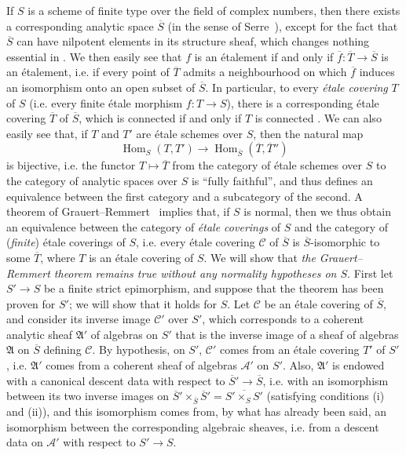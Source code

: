 \documentclass{article}
\newcommand{\scr}[1]{{\mathscr{#1}}}
\newcommand{\fk}[1]{{\mathfrak{#1}}}
\DeclareMathOperator{\Hom}{Hom}
\newcommand{\oldpage}[1]{\marginpar{\footnotesize$\Big\vert$ \textit{p.~#1}}}
\begin{document}
If $S$ is a scheme of finite type over the field of complex numbers, then there exists a corresponding analytic space $\overline{S}$ (in the sense of Serre~\cite{5}), except for the fact that $\overline{S}$ can have nilpotent elements in its structure sheaf, which changes nothing essential in \cite{5}.
We then easily see that $f$ is an \'{e}talement if and only if $\overline{f}\colon\overline{T}\to\overline{S}$ is an \'{e}talement, i.e. if every point of $\overline{T}$ admits a neighbourhood on which $\overline{f}$ induces an isomorphism onto an open subset of $\overline{S}$.
In particular, to every \emph{\'{e}tale covering} $T$ of $S$ (i.e. every finite \'{e}tale morphism $f\colon T\to S$), there is a corresponding \'{e}tale covering $\overline{T}$ of $\overline{S}$, which is connected if and only if $T$ is connected \cite{5}.
We can also easily see that, if $T$ and $T'$ are \'{e}tale schemes over $S$, then the natural map
\[
  \Hom_S(T,T') \to \Hom_{\overline{S}}(\overline{T},\overline{T}'')
\]
is bijective, i.e. the functor $T\mapsto\overline{T}$ from the category of \'{e}tale schemes over $S$ to the category of analytic spaces over $S$ is ``fully faithful'', and thus defines an equivalence between the first category and a subcategory of the second.
A theorem of Grauert--Remmert~\cite{2} implies that, if $S$ is normal, then we thus obtain an equivalence between the category of \emph{\'{e}tale coverings} of $S$ and the category of (\emph{finite}) \'{e}tale coverings of $S$, i.e. every \'{e}tale covering $\scr{C}$ of $\overline{S}$ is $\overline{S}$-isomorphic to some $\overline{T}$, where $T$ is an \'{e}tale covering of $S$.
We will show that \emph{the Grauert--Remmert theorem remains true without any normality hypotheses on $S$}.
First let $S'\to S$ be a finite strict epimorphism, and suppose that
\oldpage{190-11}
the theorem has been proven for $S'$; we will show that it holds for $S$.
Let $\scr{C}$ be an \'{e}tale covering of $\overline{S}$, and consider its inverse image $\scr{C}'$ over $S'$, which corresponds to a coherent analytic sheaf $\fk{A}'$ of algebras on $S'$ that is the inverse image of a sheaf of algebras $\fk{A}$ on $\overline{S}$ defining $\scr{C}$.
By hypothesis, on $S'$, $\scr{C}'$ comes from an \'{e}tale covering $T'$ of $S'$, i.e. $\fk{A}'$ comes from a coherent sheaf of algebras $\scr{A}'$ on $S'$.
Also, $\fk{A}'$ is endowed with a canonical descent data with respect to $\overline{S}'\to\overline{S}$, i.e. with an isomorphism between its two inverse images on $\overline{S}'\times_{\overline{S}}\overline{S}'=\overline{S'\times_SS'}$ (satisfying conditions (i) and (ii)), and this isomorphism comes from, by what has already been said, an isomorphism between the corresponding algebraic sheaves, i.e. from a descent data on $\scr{A}'$ with respect to $S'\to S$.
\end{document}
